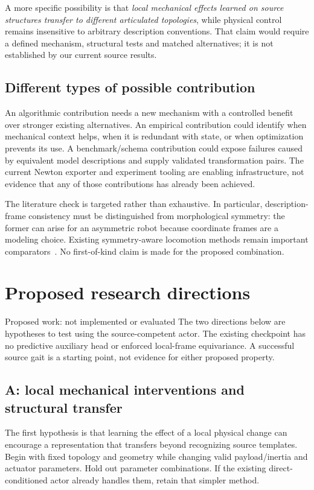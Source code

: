 \documentclass[11pt,letterpaper]{article}
\begin{document}
A more specific possibility is that \emph{local mechanical effects learned on
source structures transfer to different articulated topologies}, while physical
control remains insensitive to arbitrary description conventions. That claim
would require a defined mechanism, structural tests and matched alternatives;
it is not established by our current source results.

\subsection{Different types of possible contribution}
An algorithmic contribution needs a new mechanism with a controlled benefit over
stronger existing alternatives. An empirical contribution could identify when
mechanical context helps, when it is redundant with state, or when optimization
prevents its use. A benchmark/schema contribution could expose failures caused by
equivalent model descriptions and supply validated transformation pairs. The
current Newton exporter and experiment tooling are enabling infrastructure, not
evidence that any of those contributions has already been achieved.

The literature check is targeted rather than exhaustive. In particular,
description-frame consistency must be distinguished from morphological symmetry:
the former can arise for an asymmetric robot because coordinate frames are a
modeling choice. Existing symmetry-aware locomotion methods remain important
comparators~\cite{symmetry}. No first-of-kind claim is made for the proposed
combination.

\section{Proposed research directions}
\label{sec:proposals}

\begin{finding}{Proposed work: not implemented or evaluated}
The two directions below are hypotheses to test using the source-competent actor.
The existing checkpoint has no predictive auxiliary head or enforced local-frame
equivariance. A successful source gait is a starting point, not evidence for
either proposed property.
\end{finding}

\subsection{A: local mechanical interventions and structural transfer}
\label{sec:interventions}
The first hypothesis is that learning the effect of a local physical change can
encourage a representation that transfers beyond recognizing source templates.
Begin with fixed topology and geometry while changing valid payload/inertia and
actuator parameters. Hold out parameter combinations. If the existing
direct-conditioned actor already handles them, retain that simpler method.
\end{document}
